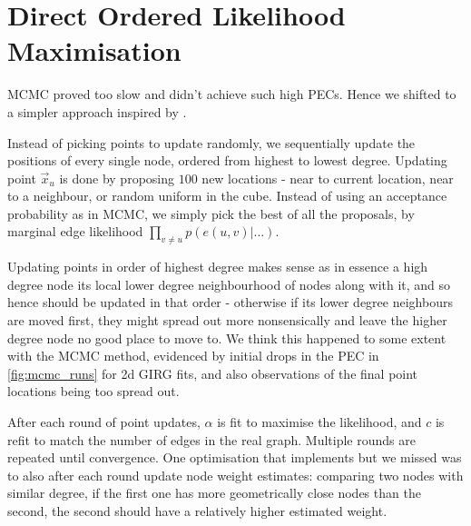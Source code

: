 \section{Direct Ordered Likelihood Maximisation}
MCMC proved too slow and didn't achieve such high PECs. Hence we shifted to a simpler approach inspired by \cite{garcia2019mercator}.

Instead of picking points to update randomly, we sequentially update the positions of every single node, ordered from highest to lowest degree. Updating point $\vec{x}_u$ is done by proposing $100$ new locations - near to current location, near to a neighbour, or random uniform in the cube. Instead of using an acceptance probability as in MCMC, we simply pick the best of all the proposals, by marginal edge likelihood $\prod_{v \neq u} p(e(u,v) | ...)$.

Updating points in order of highest degree makes sense as in essence a high degree node  its local lower degree neighbourhood of nodes along with it, and so hence should be updated in that order - otherwise if its lower degree neighbours are moved first, they might spread out more nonsensically and leave the higher degree node no good place to move to. We think this happened to some extent with the MCMC method, evidenced by initial drops in the PEC in \cref{fig:mcmc_runs} for 2d GIRG fits, and also observations of the final point locations being too spread out.

After each round of point updates, $\alpha$ is fit to maximise the likelihood, and $c$ is refit to match the number of edges in the real graph. Multiple rounds are repeated until convergence. One optimisation that \cite{garcia2019mercator} implements but we missed was to also after each round update node weight estimates: comparing two nodes with similar degree, if the first one has more geometrically close nodes than the second, the second should have a relatively higher estimated weight.

